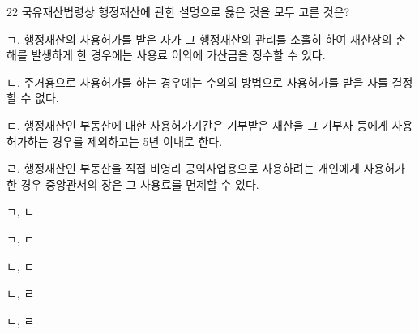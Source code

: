 \begin{question}{22}
국유재산법령상 행정재산에 관한 설명으로 옳은 것을 모두 고른 것은?
\begin{framedtext}
ㄱ. 행정재산의 사용허가를 받은 자가 그 행정재산의 관리를 소홀히 하여 재산상의 손해를 발생하게 한 경우에는 사용료 이외에 가산금을 징수할 수 있다. \par
ㄴ. 주거용으로 사용허가를 하는 경우에는 수의의 방법으로 사용허가를 받을 자를 결정할 수 없다. \par
ㄷ. 행정재산인 부동산에 대한 사용허가기간은 기부받은 재산을 그 기부자 등에게 사용허가하는 경우를 제외하고는 5년 이내로 한다. \par
ㄹ. 행정재산인 부동산을 직접 비영리 공익사업용으로 사용하려는 개인에게 사용허가한 경우 중앙관서의 장은 그 사용료를 면제할 수 있다. \par
\end{framedtext}
\begin{choices}
  \item ㄱ, ㄴ
  \item ㄱ, ㄷ
  \item ㄴ, ㄷ
  \item ㄴ, ㄹ
  \item ㄷ, ㄹ
\end{choices}
\end{question}
